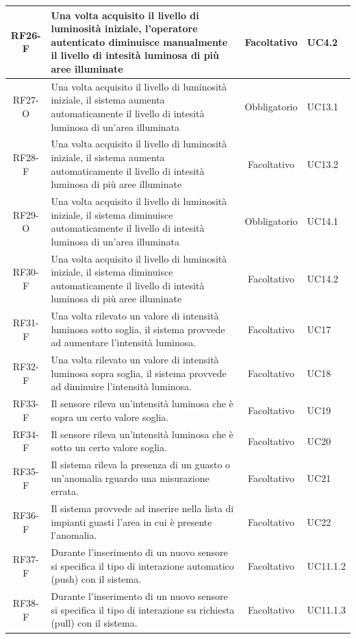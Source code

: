 \documentclass[a4paper, 12pt]{article}
\begin{document}
\begin{longtable}{|c|p{7cm}|c|p{4cm}|}
    \hline
    RF26-F & Una volta acquisito il livello di luminosità iniziale, l'operatore autenticato diminuisce manualmente il livello di intesità luminosa di più aree illuminate & Facoltativo & UC4.2 \\
    \hline
    RF27-O & Una volta acquisito il livello di luminosità iniziale, il sistema aumenta automaticamente il livello di intesità luminosa di un'area illuminata & Obbligatorio & UC13.1 \\
    \hline
    RF28-F & Una volta acquisito il livello di luminosità iniziale, il sistema aumenta automaticamente il livello di intesità luminosa di più aree illuminate & Facoltativo & UC13.2 \\
    \hline
    RF29-O & Una volta acquisito il livello di luminosità iniziale, il sistema diminuisce automaticamente il livello di intesità luminosa di un'area illuminata & Obbligatorio & UC14.1 \\
    \hline
    RF30-F & Una volta acquisito il livello di luminosità iniziale, il sistema diminuisce automaticamente il livello di intesità luminosa di più aree illuminate & Facoltativo & UC14.2 \\
    \hline
    RF31-F & Una volta rilevato un valore di intensità luminosa sotto soglia, il sistema provvede ad aumentare l'intensità luminosa. & Facoltativo & UC17\\
    \hline
    RF32-F & Una volta rilevato un valore di intensità luminosa sopra soglia, il sistema provvede ad diminuire l'intensità luminosa. & Facoltativo & UC18\\
    \hline
    RF33-F & Il sensore rileva un'intensità luminosa che è sopra un certo valore soglia. & Facoltativo & UC19\\
    \hline
    RF34-F & Il sensore rileva un'intensità luminosa che è sotto un certo valore soglia. & Facoltativo & UC20\\
    \hline
    RF35-F & Il sistema rileva la presenza di un guasto o un'anomalia rguardo una misurazione errata. & Facoltativo & UC21\\
    \hline
    RF36-F & Il sistema provvede ad inserire nella lista di impianti guasti l'area in cui è presente l'anomalia. & Facoltativo & UC22\\    
    \hline
    RF37-F & Durante l'inserimento di un nuovo sensore si specifica il tipo di interazione automatico (push) con il sistema. & Facoltativo & UC11.1.2\\
    \hline
    RF38-F & Durante l'inserimento di un nuovo sensore si specifica il tipo di interazione su richiesta (pull) con il sistema. & Facoltativo & UC11.1.3\\

\end{longtable}
\end{document}
